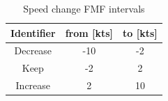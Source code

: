 \begin{table}[h!]
\begin{minipage}{.5\linewidth}
    \end{minipage}%
    \begin{minipage}{.5\linewidth}
        \caption{Speed change  FMF intervals}
        \centering
        \begin{tabular}{ccc}
            \toprule
            Identifier                    & from [kts] & to [kts] \\
            \midrule
            \rowcolor{black!20} Decrease  & -10        & -2       \\
            Keep                          & -2         & 2        \\
            \rowcolor{black!20}  Increase & 2          & 10       \\

            \bottomrule
        \end{tabular}

    \end{minipage}%
\end{table}









